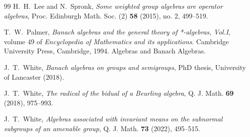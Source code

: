 \documentclass[twoside,11pt]{amsart}
\numberwithin{equation}{section}
\theoremstyle{definition}
\newcommand{\1}{\mathbbm{1}}
\begin{document}
\begin{thebibliography}{99}
		 H.\ H.\ Lee and N.\ Spronk, \emph{Some weighted group algebras are operator algebras}, Proc. Edinburgh Math. Soc. (2) \textbf{58} (2015), no. 2, 499--519.
		\vskip 2mm
		
		 T.\ W.\ Palmer, \emph{Banach algebras and the general theory of *-algebras, Vol.I}, volume 49 of \emph{Encyclopedia of Mathematics and its applications}. Cambridge University Press, Cambridge, 1994. Algebras and Banach Algebras.
		\vskip 2mm
		
		 J.\ T.\ White, \emph{Banach algebras on groups and semigroups}, PhD thesis, University of Lancaster (2018).
		\vskip 2mm
		
		 J.\ T.\ White, \emph{The radical of the bidual of a Beurling algebra}, Q. J. Math. \textbf{69} (2018), 975--993.
		\vskip 2mm
		
		 J.\ T.\ White, \emph{Algebras associated with invariant means on the subnormal subgroups of an amenable group}, Q. J. Math. \textbf{73} (2022), 495--515.
	\end{thebibliography}
	
\end{document}

